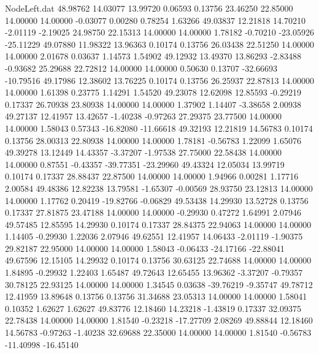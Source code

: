 \begin{filecontents}{NodeLeft.dat}
  48.98762   14.03077   13.99720     0.06593    0.13756   23.46250   22.85000   14.00000   14.00000   -0.03077    0.00280    0.78254    1.63266
  49.03837   12.21818   14.70210    -2.01119   -2.19025   24.98750   22.15313   14.00000   14.00000    1.78182   -0.70210  -23.05926  -25.11229
  49.07880   11.98322   13.96363     0.10174    0.13756   26.03438   22.51250   14.00000   14.00000    2.01678    0.03637    1.14573    1.54902
  49.12932   13.49370   13.86293    -2.83488   -0.93682   25.29688   22.72812   14.00000   14.00000    0.50630    0.13707  -32.66693  -10.79516
  49.17986   12.38602   13.76225     0.10174    0.13756   26.25937   22.87813   14.00000   14.00000    1.61398    0.23775    1.14291    1.54520
  49.23078   12.62098   12.85593    -0.29219    0.17337   26.70938   23.80938   14.00000   14.00000    1.37902    1.14407   -3.38658    2.00938
  49.27137   12.41957   13.42657    -1.40238   -0.97263   27.29375   23.77500   14.00000   14.00000    1.58043    0.57343  -16.82080  -11.66618
  49.32193   12.21819   14.56783     0.10174    0.13756   28.00313   22.80938   14.00000   14.00000    1.78181   -0.56783    1.22099    1.65076
  49.39278   13.12449   14.43357    -3.37207   -1.97538   27.75000   22.58438   14.00000   14.00000    0.87551   -0.43357  -39.77351  -23.29960
  49.43324   12.05034   13.99719     0.10174    0.17337   28.88437   22.87500   14.00000   14.00000    1.94966    0.00281    1.17716    2.00584
  49.48386   12.82238   13.79581    -1.65307   -0.00569   28.93750   23.12813   14.00000   14.00000    1.17762    0.20419  -19.82766   -0.06829
  49.53438   14.29930   13.52728     0.13756    0.17337   27.81875   23.47188   14.00000   14.00000   -0.29930    0.47272    1.64991    2.07946
  49.57485   12.85595   14.29930     0.10174    0.17337   28.84375   22.94063   14.00000   14.00000    1.14405   -0.29930    1.22036    2.07946
  49.62551   12.41957   14.06433    -2.01119   -1.90375   29.82187   22.95000   14.00000   14.00000    1.58043   -0.06433  -24.17166  -22.88041
  49.67596   12.15105   14.29932     0.10174    0.13756   30.63125   22.74688   14.00000   14.00000    1.84895   -0.29932    1.22403    1.65487
  49.72643   12.65455   13.96362    -3.37207   -0.79357   30.78125   22.93125   14.00000   14.00000    1.34545    0.03638  -39.76219   -9.35747
  49.78712   12.41959   13.89648     0.13756    0.13756   31.34688   23.05313   14.00000   14.00000    1.58041    0.10352    1.62627    1.62627
  49.83776   12.18460   14.23218    -1.43819    0.17337   32.09375   22.78438   14.00000   14.00000    1.81540   -0.23218  -17.27709    2.08269
  49.88844   12.18460   14.56783    -0.97263   -1.40238   32.69688   22.35000   14.00000   14.00000    1.81540   -0.56783  -11.40998  -16.45140

\end{filecontents}
